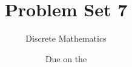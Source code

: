
% 
% 
% 

\title{Problem Set 7}
\author[Daniel Gonzalez Cedre]{Discrete Mathematics}
\date{Due on the }




\maketitle

